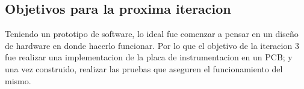 \subsection{Objetivos para la proxima iteracion} %
\label{it2:sub:objetivos_para_la_proxima_iteracion}

Teniendo un prototipo de software, lo ideal fue comenzar a pensar en un diseño de hardware en donde hacerlo funcionar. Por lo que el objetivo de la iteracion 3 fue realizar una implementacion de la placa de instrumentacion en un PCB; y una vez construido, realizar las pruebas que aseguren el funcionamiento del mismo.


